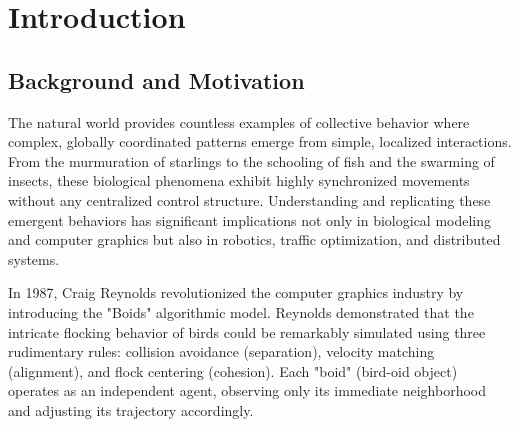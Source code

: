 \documentclass[12pt,a4paper]{report}
\begin{document}
\begin{abstract}
\thispagestyle{plain}
This comprehensive academic report details the design, theoretical foundations, implementation architecture, and performance analysis of a high-performance, real-time simulation of emergent flocking behavior (commonly known as "Boids"). Utilizing the NVIDIA CUDA parallel computing platform alongside the OpenGL rendering API, this project successfully models the complex emergent dynamics of up to 200,000 independent agents at interactive frame rates. The report provides an exhaustive exploration of the mathematical formalizations governing agent behavior, including separation, alignment, cohesion, predator-prey dynamics, and complex obstacle avoidance. Furthermore, it deeply analyzes the transition from a naive $O(N^2)$ algorithmic complexity to a highly scalable $O(N \cdot K)$ complexity via grid-based spatial hashing algorithms sorted by Thrust radix sorts. The graphics rendering pipeline is also thoroughly dissected, highlighting the utilization of zero-copy CUDA-OpenGL interoperability, dynamic level-of-detail (LOD) scaling, and instanced rendering to overcome massive geometry throughput bottlenecks. Finally, extensive performance benchmarking, a discussion of technical challenges (such as massive fragment overdraw), and potential future expansions into multi-GPU and machine learning integrations are presented.
\end{abstract}

\tableofcontents
\newpage

\chapter{Introduction}
\section{Background and Motivation}
The natural world provides countless examples of collective behavior where complex, globally coordinated patterns emerge from simple, localized interactions. From the murmuration of starlings to the schooling of fish and the swarming of insects, these biological phenomena exhibit highly synchronized movements without any centralized control structure. Understanding and replicating these emergent behaviors has significant implications not only in biological modeling and computer graphics but also in robotics, traffic optimization, and distributed systems.

In 1987, Craig Reynolds revolutionized the computer graphics industry by introducing the "Boids" algorithmic model. Reynolds demonstrated that the intricate flocking behavior of birds could be remarkably simulated using three rudimentary rules: collision avoidance (separation), velocity matching (alignment), and flock centering (cohesion). Each "boid" (bird-oid object) operates as an independent agent, observing only its immediate neighborhood and adjusting its trajectory accordingly.
\end{document}
